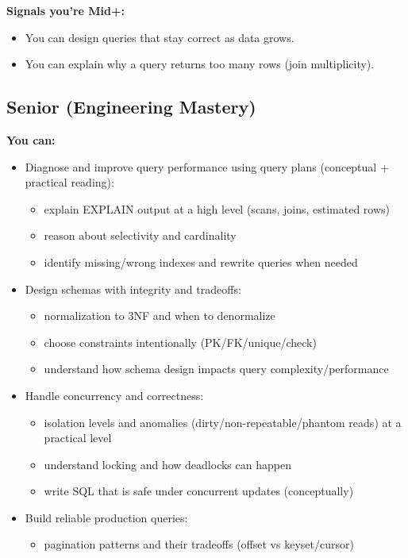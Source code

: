 \textbf{Signals you're Mid+:}
\begin{itemize}
    \item You can design queries that stay correct as data grows.
    \item You can explain why a query returns too many rows (join multiplicity).
\end{itemize}

\subsection{Senior (Engineering Mastery)}
\textbf{You can:}
\begin{itemize}
    \item Diagnose and improve query performance using query plans (conceptual + practical reading):
    \begin{itemize}
        \item explain EXPLAIN output at a high level (scans, joins, estimated rows)
        \item reason about selectivity and cardinality
        \item identify missing/wrong indexes and rewrite queries when needed
    \end{itemize}
    \item Design schemas with integrity and tradeoffs:
    \begin{itemize}
        \item normalization to 3NF and when to denormalize
        \item choose constraints intentionally (PK/FK/unique/check)
        \item understand how schema design impacts query complexity/performance
    \end{itemize}
    \item Handle concurrency and correctness:
    \begin{itemize}
        \item isolation levels and anomalies (dirty/non-repeatable/phantom reads) at a practical level
        \item understand locking and how deadlocks can happen
        \item write SQL that is safe under concurrent updates (conceptually)
    \end{itemize}
    \item Build reliable production queries:
    \begin{itemize}
        \item pagination patterns and their tradeoffs (offset vs keyset/cursor)

\end{itemize}
\end{itemize}
